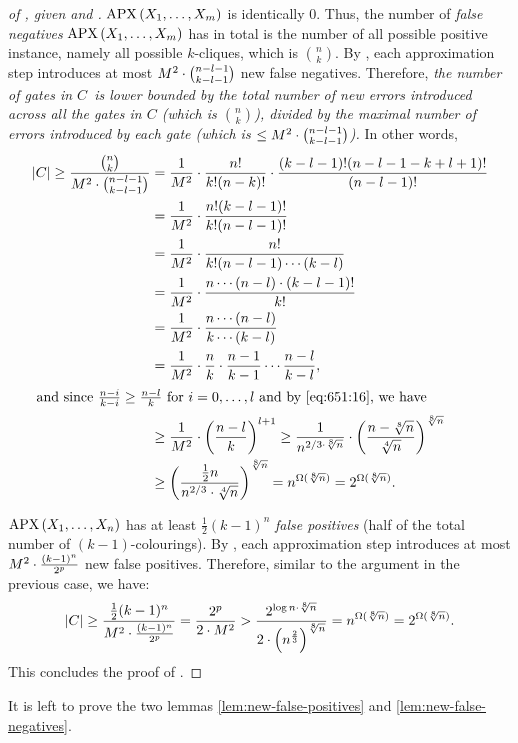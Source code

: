 \begin{proof}[of , given   and ]
\noindent {} $\operatorname{\mathrm{APX}}\left(X_1, \ldots, X_m\right) $ is identically 0. 
Thus, the number of \emph{false negatives} $\operatorname{\mathrm{APX}}\left(X_1, \ldots, X_m\right)$ has in total is the number of all possible positive instance, namely all possible $k$-cliques, which is $\binom{n}{k}$.
By ,  each approximation step introduces at most $M^2\cdot\binom{n-l-1}{k-l-1}$ new false negatives. Therefore,  \emph{the number of gates in  $C$\ is lower bounded by the total number of new errors introduced across all the  gates in $C$ (which is $\binom{n}{k}$), divided by the maximal number of errors introduced by each gate (which is $\le M^2\cdot\binom{n-l-1}{k-l-1}$).} In other words,
\begin{align*}
|C| \geq \frac{\binom{n}{k}}{M^2\cd\binom{n-l-1}{k-l-1}}
& = \frac{1}{M^2}\cd
\frac{n!}{k! (n-k)!} \cd \frac{(k-l-1)! (n-l-1-k+l+1)!}{(n-l-1)!} \\
    &=\frac{1}{M^2}\cd \frac{n! (k-l-1)!}{k! (n-l-1)!} \\
    & =\frac{1}{M^2}\cd  \frac{n! }{k!(n-l-1)\cdots (k-l)} \\
    &= \frac{1}{M^2}\cd\frac{n \cdots (n-l)\cdot (k-l-1)! }{k!} \\
    &= \frac{1}{M^2}\cd\frac{n \cdots (n-l)}{k \cdots (k-l)}
\\
& = \frac{1}{M^2}\cd \frac{n}{k} \cdot \frac{n-1}{k-1} \cdots \frac{n-l}{k-l},
\\
\intertext{
and since $\frac{n-i}{k-i} \geq \frac{n-l}{k}$
for $i=0,\dots,l$ and by \Cref{eq:651:16}, we have 
}
 & \geq \frac{1}{M^2}
 \cd\left(\frac{n-l}{k}\right)^{l+1} \geq
  \frac{1}{n^{2/3\cd\sqrt[8]{n}}}\cd
  \left(\frac{n-\sqrt[8]{n}}{\sqrt[4]{n}}\right)^{\sqrt[8]{n}} \\
& \ge
  \left(\frac{\frac{1}{2}n}{{n^{2/3}}\cd\sqrt[4]{n}}\right)^{\sqrt[8]{n}}
=
  n^{\Omega(\sqrt[8]{n})}
= 2^{\Omega(\sqrt[8]{n})}.
\end{align*}


\medskip 

\noindent{} $\operatorname{\mathrm{APX}}\left(X_1, \ldots, X_n\right)$ has at least $\frac{1}{2}(k-1)^n$ \emph{false positives} (half of the total number of  $(k-1)$-colourings).
By ,
each approximation step introduces at most $ M^2\cdot \frac{(k-1)^n}{2^p}$
 new false positives. Therefore,  similar to the argument  in the previous case, we have:
$$
|C| \geq \frac{\frac{1}{2}(k-1)^n}{M^2\cdot \frac{(k-1)^n}{2^p}}
= \frac{2^p}{2 \cdot M^2}
> \frac{2^{\log n\cdot \sqrt[8]{n}}}
    {2 \cdot \left(
        n^{\frac{2}{3}}
                \right)^{
                    \sqrt[8]{n}}
                    }
= n^{\Omega(\sqrt[8]{n})}
= 2^{\Omega(\sqrt[8]{n})}.
$$
This concludes the proof of .
\end{proof}
It is left to prove the two lemmas  \ref{lem:new-false-positives} and \ref{lem:new-false-negatives}. 





